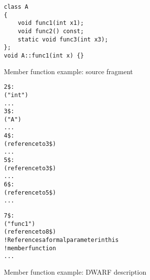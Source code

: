 \begin{figure}[h]
\begin{lstlisting}
class A
{
    void func1(int x1);
    void func2() const;
    static void func3(int x3);
};
void A::func1(int x) {}
\end{lstlisting}
\caption{Member function example: source fragment}
\label{fig:memberfunctionexamplesourcefragment}
\end{figure}

\begin{figure}[h]
\begin{dwflisting}
\begin{alltt}

2\$: \DWTAGbasetype
        \DWATname("int")
        ...
3\$: \DWTAGclasstype
        \DWATname("A")
        ...
4\$:     \DWTAGpointertype
            \DWATtype(reference to 3\$)
            ...
5\$:     \DWTAGconsttype
            \DWATtype(reference to 3\$)
            ...
6\$:     \DWTAGpointertype
            \DWATtype(reference to 5\$)
            ...

7\$:     \DWTAGsubprogram
            \DWATdeclaration
            \DWATname("func1")
            \DWATobjectpointer(reference to 8\$) 
                ! References a formal parameter in this 
                ! member function
            ...

\end{alltt}
\end{dwflisting}
\caption{Member function example: DWARF description}
\label{fig:memberfunctionexampledwarfdescription}
\end{figure}

